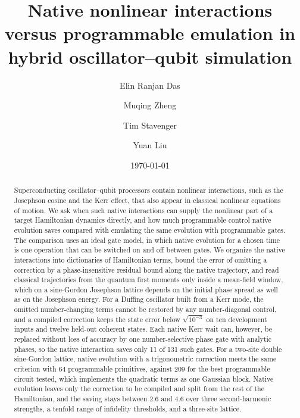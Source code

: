 \documentclass[pra,twocolumn,superscriptaddress,nofootinbib,floatfix]{revtex4-2}
\theoremstyle{remark}
\begin{document}
\title{Native nonlinear interactions versus programmable emulation in hybrid oscillator--qubit simulation}

\author{Elin Ranjan Das}
\author{Muqing Zheng}
\author{Tim Stavenger}
\author{Yuan Liu}

\date{\today}

\begin{abstract}
Superconducting oscillator--qubit processors contain nonlinear interactions, such as the Josephson cosine and the Kerr effect, that also appear in classical nonlinear equations of motion. We ask when such native interactions can supply the nonlinear part of a target Hamiltonian dynamics directly, and how much programmable control native evolution saves compared with emulating the same evolution with programmable gates. The comparison uses an ideal gate model, in which native evolution for a chosen time is one operation that can be switched on and off between gates. We organize the native interactions into dictionaries of Hamiltonian terms, bound the error of omitting a correction by a phase-insensitive residual bound along the native trajectory, and read classical trajectories from the quantum first moments only inside a mean-field window, which on a sine-Gordon Josephson lattice depends on the initial phase spread as well as on the Josephson energy. For a Duffing oscillator built from a Kerr mode, the omitted number-changing terms cannot be restored by any number-diagonal control, and a compiled correction keeps the state error below $\sqrt{10^{-3}}$ on ten development inputs and twelve held-out coherent states. Each native Kerr wait can, however, be replaced without loss of accuracy by one number-selective phase gate with analytic phases, so the native interaction saves only 11 of 131 such gates. For a two-site double sine-Gordon lattice, native evolution with a trigonometric correction meets the same criterion with 64 programmable primitives, against 209 for the best programmable circuit tested, which implements the quadratic terms as one Gaussian block. Native evolution leaves only the correction to be compiled and split from the rest of the Hamiltonian, and the saving stays between 2.6 and 4.6 over three second-harmonic strengths, a tenfold range of infidelity thresholds, and a three-site lattice.
\end{abstract}

\maketitle
\end{document}
